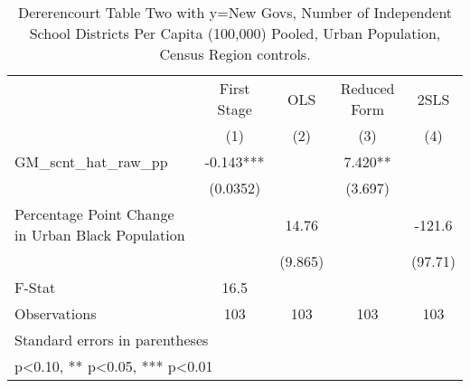 \begin{table}[htbp]\centering
\def\sym#1{\ifmmode^{#1}\else\(^{#1}\)\fi}
\caption{Dererencourt Table Two with y=New Govs, Number of Independent School Districts Per Capita (100,000) Pooled, Urban Population, Census Region controls.}
\begin{tabular}{l*{4}{c}}
\toprule
                    & First Stage   &         OLS   &Reduced Form   &        2SLS   \\
                    &\multicolumn{1}{c}{(1)}   &\multicolumn{1}{c}{(2)}   &\multicolumn{1}{c}{(3)}   &\multicolumn{1}{c}{(4)}   \\
\midrule
GM\_scnt\_hat\_raw\_pp  &      -0.143***&               &       7.420** &               \\
                    &    (0.0352)   &               &     (3.697)   &               \\
\addlinespace
Percentage Point Change in Urban Black Population&               &       14.76   &               &      -121.6   \\
                    &               &     (9.865)   &               &     (97.71)   \\
\midrule
F-Stat              &        16.5   &               &               &               \\
Observations        &         103   &         103   &         103   &         103   \\
\bottomrule
\multicolumn{5}{l}{\footnotesize Standard errors in parentheses}\\
\multicolumn{5}{l}{\footnotesize * p<0.10, ** p<0.05, *** p<0.01}\\
\end{tabular}
\end{table}
